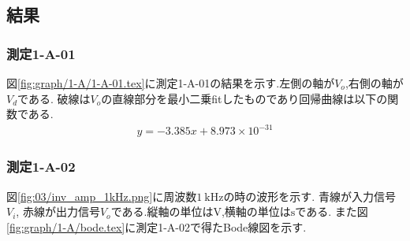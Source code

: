 \subsection{結果}
\subsubsection{測定1-A-01}
図\ref{fig:graph/1-A/1-A-01.tex}に測定1-A-01の結果を示す.左側の軸が$V_o$,右側の軸が$V_d$である.
破線は$V_o$の直線部分を最小二乗fitしたものであり回帰曲線は以下の関数である.
\begin{align}
  \label{equ:inv_amp_gain}
  y=-3.385x+8.973\times10^{-31}
\end{align}
\subsubsection{測定1-A-02}
図\ref{fig:03/inv_amp_1kHz.png}に周波数$1\ \si{\kilo\hertz}$の時の波形を示す.
青線が入力信号$V_i$, 赤線が出力信号$V_o$である.縦軸の単位は$\si{\volt}$,横軸の単位は$\si{\second}$である.
また図\ref{fig:graph/1-A/bode.tex}に測定1-A-02で得たBode線図を示す.
